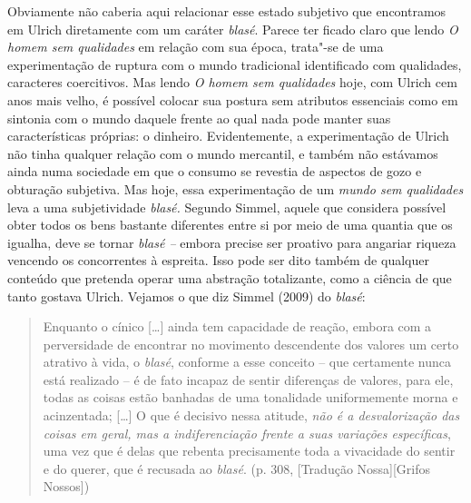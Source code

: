 Obviamente não caberia aqui relacionar esse estado subjetivo que
encontramos em Ulrich diretamente com um caráter \emph{blasé}. Parece
ter ficado claro que lendo \emph{O homem sem qualidades} em relação com
sua época, trata"-se de uma experimentação de ruptura com o mundo
tradicional identificado com qualidades, caracteres coercitivos. Mas
lendo \emph{O homem sem qualidades} hoje, com Ulrich cem anos mais
velho, é possível colocar sua postura sem atributos essenciais como em
sintonia com o mundo daquele frente ao qual nada pode manter suas
características próprias: o dinheiro. Evidentemente, a experimentação de
Ulrich não tinha qualquer relação com o mundo mercantil, e também não
estávamos ainda numa sociedade em que o consumo se revestia de aspectos
de gozo e obturação subjetiva. Mas hoje, essa experimentação de um
\emph{mundo sem qualidades} leva a uma subjetividade \emph{blasé.}
Segundo Simmel, aquele que considera possível obter todos os bens
bastante diferentes entre si por meio de uma quantia que os igualha,
deve se tornar \emph{blasé --} embora precise ser proativo para angariar
riqueza vencendo os concorrentes à espreita. Isso pode ser dito também
de qualquer conteúdo que pretenda operar uma abstração totalizante, como
a ciência de que tanto gostava Ulrich. Vejamos o que diz Simmel (2009)
do \emph{blasé}:

\begin{quote}
Enquanto o cínico [\ldots{}] ainda tem capacidade de reação, embora
com a perversidade de encontrar no movimento descendente dos valores um
certo atrativo à vida, o \emph{blasé}, conforme a esse conceito -- que
certamente nunca está realizado -- é de fato incapaz de sentir
diferenças de valores, para ele, todas as coisas estão banhadas de uma
tonalidade uniformemente morna e acinzentada; [\ldots{}] O que é
decisivo nessa atitude, \emph{não é a desvalorização das coisas em
geral, mas a indiferenciação frente a suas variações específicas}, uma
vez que é delas que rebenta precisamente toda a vivacidade do sentir e
do querer, que é recusada ao \emph{blasé}. (p. 308, [Tradução
Nossa][Grifos Nossos])
\end{quote}

